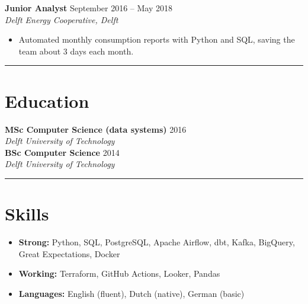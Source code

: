 \documentclass[10pt,a4paper]{article}
\newcommand{\sectionrule}{\par\vspace{2pt}\hrule\vspace{6pt}}
\newcommand{\entry}[3]{\textbf{#1} \hfill #3\\ \emph{#2}\vspace{-2pt}}
\begin{document}
\entry{Junior Analyst}{Delft Energy Cooperative, Delft}{September 2016 -- May 2018}
\begin{itemize}\setlength\itemsep{4pt}
  \item Automated monthly consumption reports with Python and SQL, saving the team about 3 days each month.
\end{itemize}
\sectionrule

\section*{Education}
\entry{MSc Computer Science (data systems)}{Delft University of Technology}{2016}\\[6pt]
\entry{BSc Computer Science}{Delft University of Technology}{2014}
\sectionrule

\section*{Skills}
\begin{itemize}\setlength\itemsep{4pt}
  \item \textbf{Strong:} Python, SQL, PostgreSQL, Apache Airflow, dbt, Kafka, BigQuery, Great
    Expectations, Docker
  \item \textbf{Working:} Terraform, GitHub Actions, Looker, Pandas
  \item \textbf{Languages:} English (fluent), Dutch (native), German (basic)
\end{itemize}
\end{document}

